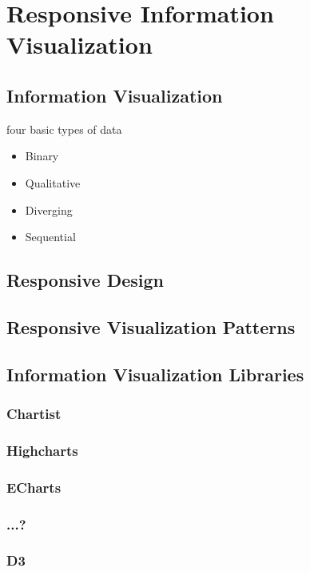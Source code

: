 \chapter{Responsive Information Visualization}

\label{chap:ResponsiveInfoVis}


\section{Information Visualization}

four basic types of data
\begin{itemize}
    \item Binary
    \item Qualitative
    \item Diverging
    \item Sequential
\end{itemize}

\section{Responsive Design}


\section{Responsive Visualization Patterns}



\section{Information Visualization Libraries}

\subsection{Chartist}
\subsection{Highcharts}
\subsection{ECharts}
\subsection{...?}
\subsection{D3}
